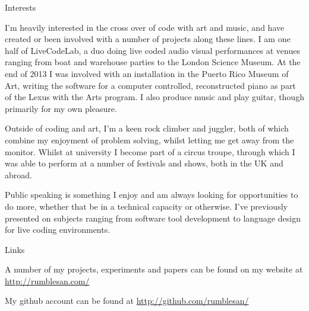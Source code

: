 \documentclass{resume} %
\begin{document}

\begin{rSection}{Interests}

  I'm heavily interested in the cross over of code with art and music, and have created or been involved with a number of projects along these lines. I am one half of LiveCodeLab, a duo doing live coded audio visual performances at venues ranging from boat and warehouse parties to the London Science Museum. At the end of 2013 I was involved with an installation in the Puerto Rico Museum of Art, writing the software for a computer controlled, reconstructed piano as part of the Lexus with the Arts program. I also produce music and play guitar, though primarily for my own pleasure.

  Outside of coding and art, I'm a keen rock climber and juggler, both of which combine my enjoyment of problem solving, whilst letting me get away from the monitor. Whilst at university I become part of a circus troupe, through which I was able to perform at a number of festivals and shows, both in the UK and abroad.

  Public speaking is something I enjoy and am always looking for opportunities to do more, whether that be in a technical capacity or otherwise. I've previously presented on subjects ranging from software tool development to language design for live coding environments.

\end{rSection}

\begin{rSection}{Links}

  A number of my projects, experiments and papers can be found on my website at \url{http://rumblesan.com/}

  My github account can be found at \url{http://github.com/rumblesan/}

\end{rSection}
\end{document}
